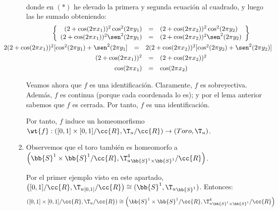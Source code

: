 \begin{ejemplo}
\begin{enumerate}
\begin{equation*}
\begin{split}
            \end{split}
        \end{equation*}
        donde en $(\ast)$ he elevado la primera y segunda ecuación al cuadrado, y luego las he sumado obteniendo:
        \begin{gather*}
            \left\{
            \begin{array}{rcl}
                (2+\cos(2\pi x_1))^2\cos^2(2\pi y_1) & = & (2+\cos(2\pi x_2))^2\cos^2(2\pi y_2)  \\
                (2+\cos(2\pi x_1))^2\sen^2(2\pi y_1) & = & (2+\cos(2\pi x_2))^2\sen^2(2\pi y_2)
            \end{array}
            \right\} \\
            \hspace{-1.42cm}
            \begin{array}{rcl}
                2(2+\cos(2\pi x_1))^2[\cos^2(2\pi y_1)+\sen^2(2\pi y_1] & = & 2(2+\cos(2\pi x_2))^2[\cos^2(2\pi y_2)+\sen^2(2\pi y_2)]
            \end{array}
             \\
            \begin{array}{rcl}
                (2+\cos(2\pi x_1))^2 & = & (2+\cos(2\pi x_2))^2
            \end{array}
            \\
            \begin{array}{rcl}
                \cos(2\pi x_1) & = & \cos(2\pi x_2)
            \end{array}
        \end{gather*}

        Veamos ahora que $f$ es una identificación. Claramente, $f$ es sobreyectiva. Además, $f$ es continua (porque cada coordenada lo es); y por el lema anterior sabemos que $f$ es cerrada. Por tanto, $f$ es una identificación.

        Por tanto, $f$ induce un homeomorfismo $\wt{f}:\left([0,1]\times [0,1]/\cc{R}, \T_u/\cc{R}\right)\to (Toro, \T_u)$.

        \item Observemos que el toro también es homeomorfo a $\left(\bb{S}^1\times \bb{S}^1/\cc{R}, {\T_u^4}_{\bb{S}^1\times \bb{S}^1}/\cc{R}\right)$.


        Por el primer ejemplo visto en este apartado, $\left([0,1]/\cc{R},{\T_u}_{[0,1]}/\cc{R}\right)\cong (\bb{S}^1,{\T_u}_{\bb{S}^1})$. Entonces:
        \begin{equation*}
            \left([0,1]\times [0,1]/\cc{R},{\T_u}/\cc{R}\right)\cong \left(\bb{S}^1\times \bb{S}^1/\cc{R}, {\T_u^4}_{\bb{S}^1\times \bb{S}^1}/\cc{R}\right)
        \end{equation*}



\end{enumerate}
\end{ejemplo}
